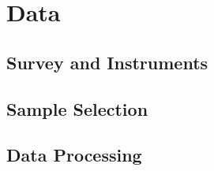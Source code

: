 \section{Data}
\label{sec:data}

\subsection{Survey and Instruments}
\label{subsec:survey}


\subsection{Sample Selection}
\label{subsec:sample}


\subsection{Data Processing}
\label{subsec:reduction}

